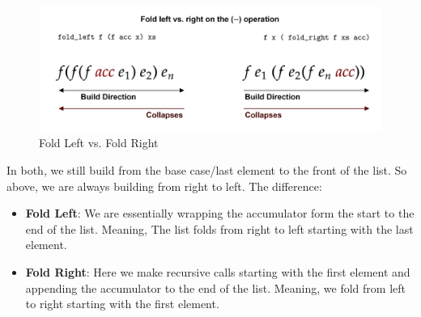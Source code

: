 \begin{figure}[h]
    
    \hspace{-.5em}
    \includegraphics[width=1\textwidth]{Sections/order/fold.png}
    \caption{Fold Left vs. Fold Right}
\end{figure}

\noindent
In both, we still build from the base case/last element to the front of the list. So above, we are always building from right to left.
The difference: 

\begin{itemize}
    \item \textbf{Fold Left}: We are essentially wrapping the accumulator form the start to the end of the list. Meaning,
    The list folds from right to left starting with the last element.
    \item \textbf{Fold Right}: Here we make recursive calls starting with the first element and appending the accumulator to the end of the list. Meaning,
    we fold from left to right starting with the first element.
\end{itemize}





